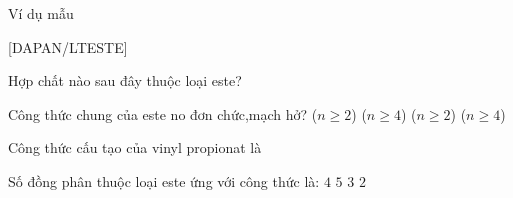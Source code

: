 \begin{vdm}{Ví dụ mẫu}
\end{vdm}
[DAPAN/LTESTE]
\begin{vdex}
	Hợp chất nào sau đây thuộc loại este?
	\choice
	{%
	\True {}
	}
{%
}
{%
}
{%
}
	\huongdan{%
	
}
\end{vdex}

\begin{vdex}
	Công thức chung của este no đơn chức,mạch hở?
	\choice
	{%
		\True {} ($ n\geq 2 $)
	}
	{%
		 ($ n\geq 4 $)
	}
	{%
		 ($ n\geq 2 $)
	}
	{%
		 ($ n\geq 4 $)}
		\huongdan{%
		
	}
\end{vdex}



\begin{vdex}
	Công thức cấu tạo của vinyl propionat là
	\choice
	{%
		\True {}
	}
	{%
		\True {} 
	}
	{%
	}
	{%
	}
	
		\huongdan{%
		
	}
\end{vdex}


\begin{vdex}
	Số đồng phân thuộc loại este ứng với công thức  là:
	\choice
	{%
		\True $ 4 $
	}
	{%
		$ 5 $
	}
	{%
		$ 3 $
	}
	{%
		$ 2 $
	}
		\huongdan{%
		
	}
\end{vdex}


